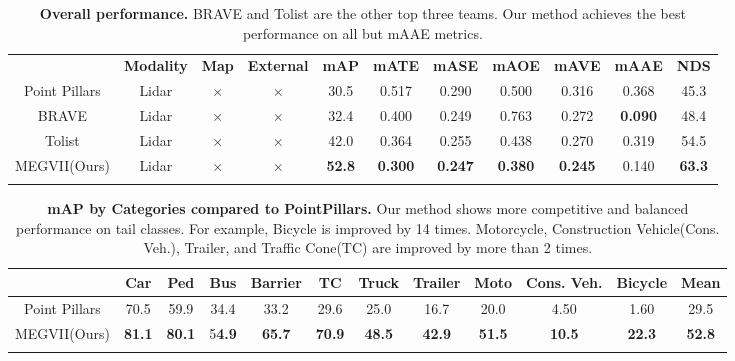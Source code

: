 \documentclass[10pt,twocolumn,letterpaper]{article}
\begin{document}
\begin{table*}[t]
    \begin{center}
    \begin{tabular} {c|c|c|c|c|c|c|c|c|c|c}
        \Xhline{0.8pt}
        & \textbf{Modality} & \textbf{Map} & \textbf{External} & \textbf{mAP} & \textbf{mATE} & \textbf{mASE} & \textbf{mAOE} & \textbf{mAVE} & \textbf{mAAE} & \textbf{NDS} \\
        \Xhline{0.8pt}
        Point Pillars \cite{pointpillars} & Lidar & $\mathcal{\times}$ & $\mathcal{\times}$ & 30.5 & 0.517 & 0.290 & 0.500 & 0.316 & 0.368 & 45.3 \\
        \hline
        BRAVE \cite{nusc3ddet} & Lidar & $\mathcal{\times}$ & $\mathcal{\times}$ &  32.4 & 0.400 & 0.249 & 0.763 & 0.272 & \textbf{0.090} & 48.4 \\
        \hline
        Tolist \cite{nusc3ddet} & Lidar & $\mathcal{\times}$ & $\mathcal{\times}$ & 42.0 & 0.364 & 0.255 & 0.438 & 0.270 & 0.319 & 54.5 \\
        \hline
        MEGVII(Ours) & Lidar & $\mathcal{\times}$ & $\mathcal{\times}$ & \textbf{52.8} & \textbf{0.300} & \textbf{0.247} & \textbf{0.380} & \textbf{0.245} & 0.140 & \textbf{63.3} \\
        \Xhline{0.8pt}
    \end{tabular}
    \end{center}
    \caption{\textbf{Overall performance.} BRAVE and Tolist are the other top three teams. Our method achieves the best performance on all but mAAE metrics.}
    \label{table:overall}
\end{table*}

\begin{table*}[t]
    \begin{center}
    \begin{tabular} {c|c|c|c|c|c|c|c|c|c|c|c}
        \Xhline{0.8pt}
        & Car & Ped & Bus & Barrier & TC & Truck & Trailer & Moto & Cons. Veh. & Bicycle & Mean \\
        \hline
        Point Pillars \cite{pointpillars} & 70.5 & 59.9 & 34.4 & 33.2 & 29.6 & 25.0 & 16.7 & 20.0 & 4.50 & 1.60 & 29.5\\
        \hline
        MEGVII(Ours) & \textbf{81.1} & \textbf{80.1} & 5\textbf{4.9} & \textbf{65.7} & \textbf{70.9} & \textbf{48.5} & \textbf{42.9} & \textbf{51.5} & \textbf{10.5} & \textbf{22.3} & \textbf{52.8} \\
        \Xhline{0.8pt}
    \end{tabular}
    \end{center}
    \label{table:percls}
    \caption{\textbf{mAP by Categories compared to PointPillars.} Our method shows more competitive and balanced performance on tail classes. For example, Bicycle is improved by 14 times. Motorcycle, Construction Vehicle(Cons. Veh.), Trailer, and Traffic Cone(TC) are improved by more than 2 times.}
\end{table*}
\end{document}
